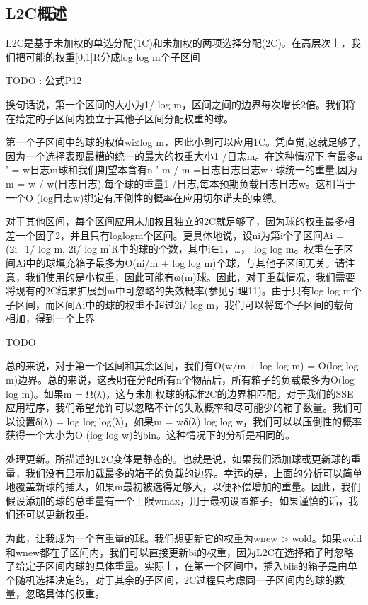 \documentclass[UTF8]{article}
\begin{document}
\subsection{L2C概述}
L2C是基于未加权的单选分配(1C)和未加权的两项选择分配(2C)。在高层次上，我们把可能的权重[0,1]R分成log log m个子区间

TODO : 公式P12

换句话说，第一个区间的大小为1/ log m，区间之间的边界每次增长2倍。我们将在给定的子区间内独立于其他子区间分配权重的球。

第一个子区间中的球的权值wi≤log m，因此小到可以应用1C。凭直觉,这就足够了,因为一个选择表现最糟的统一的最大的权重大小1 /日志m。在这种情况下,有最多n ' = w日志m球和我们期望本含有n ' m / m =日志日志日志w·球统一的重量,因为m = w / w(日志日志),每个球的重量1 /日志,每本预期负载日志日志w。这相当于一个O (log日志w)绑定有压倒性的概率在应用切尔诺夫的束缚。


对于其他区间，每个区间应用未加权且独立的2C就足够了，因为球的权重最多相差一个因子2，并且只有loglogm个区间。更具体地说，设ni为第i个子区间Ai = (2i−1/ log m, 2i/ log m]R中的球的个数，其中i∈{1，…， log log m}。权重在子区间Ai中的球填充箱子最多为O(ni/m + log log m)个球，与其他子区间无关。请注意，我们使用的是小权重，因此可能有ω(m)球。因此，对于重载情况，我们需要将现有的2C结果扩展到m中可忽略的失效概率(参见引理11)。由于只有log log m个子区间，而区间Ai中的球的权重不超过2i/ log m，我们可以将每个子区间的载荷相加，得到一个上界

TODO

总的来说，对于第一个区间和其余区间，我们有O(w/m + log log m) = O(log log m)边界。总的来说，这表明在分配所有n个物品后，所有箱子的负载最多为O(log log m)。如果m = Ω(λ)，这与未加权球的标准2C的边界相匹配。对于我们的SSE应用程序，我们希望允许可以忽略不计的失败概率和尽可能少的箱子数量。我们可以设置δ(λ) = log log log(λ)，如果m = wδ(λ) log log w，我们可以以压倒性的概率获得一个大小为O (log log w)的bin。这种情况下的分析是相同的。

处理更新。所描述的L2C变体是静态的。也就是说，如果我们添加球或更新球的重量，我们没有显示加载最多的箱子的负载的边界。幸运的是，上面的分析可以简单地覆盖新球的插入，如果m最初被选得足够大，以便补偿增加的重量。因此，我们假设添加的球的总重量有一个上限wmax，用于最初设置箱子。如果谨慎的话，我们还可以更新权重。

为此，让我成为一个有重量的球。我们想更新它的权重为wnew > wold。如果wold和wnew都在子区间内，我们可以直接更新bi的权重，因为L2C在选择箱子时忽略了给定子区间内球的具体重量。实际上，在第一个区间中，插入biis的箱子是由单个随机选择决定的，对于其余的子区间，2C过程只考虑同一子区间内的球的数量，忽略具体的权重。
\end{document}
